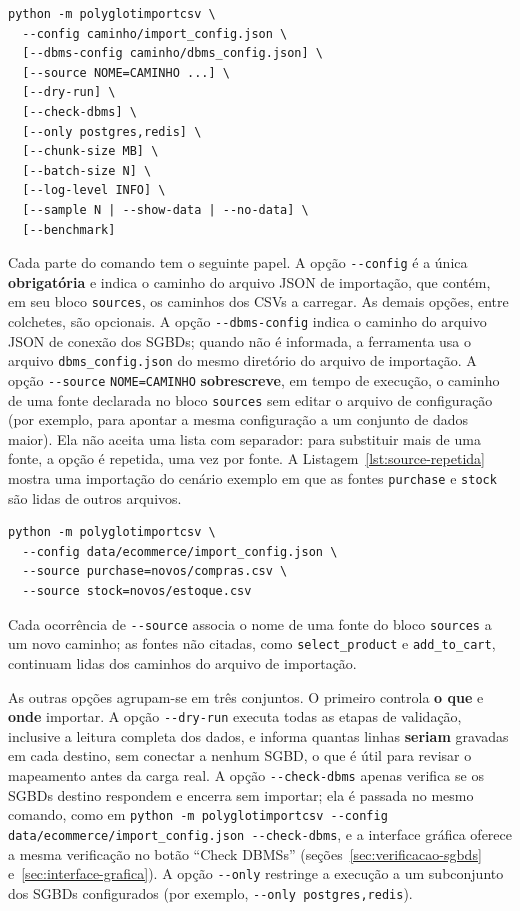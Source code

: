 \begin{lstlisting}[style=bashstyle]
python -m polyglotimportcsv \
  --config caminho/import_config.json \
  [--dbms-config caminho/dbms_config.json] \
  [--source NOME=CAMINHO ...] \
  [--dry-run] \
  [--check-dbms] \
  [--only postgres,redis] \
  [--chunk-size MB] \
  [--batch-size N] \
  [--log-level INFO] \
  [--sample N | --show-data | --no-data] \
  [--benchmark]
\end{lstlisting}

Cada parte do comando tem o seguinte papel. A opção \texttt{-{}-config} é a única
\textbf{obrigatória} e indica o caminho do arquivo JSON de importação, que contém, em seu
bloco \texttt{sources}, os caminhos dos CSVs a carregar. As demais opções, entre
colchetes, são opcionais. A opção \texttt{-{}-dbms-config} indica o caminho do arquivo
JSON de conexão dos SGBDs; quando não é informada, a ferramenta usa o arquivo
\texttt{dbms\_config.json} do mesmo diretório do arquivo de importação. A opção
\texttt{-{}-source} \texttt{NOME=CAMINHO} \textbf{sobrescreve}, em tempo de execução, o
caminho de uma fonte declarada no bloco \texttt{sources} sem editar o arquivo de
configuração (por exemplo, para apontar a mesma configuração a um conjunto de dados
maior). Ela não aceita uma lista com separador: para substituir mais de uma fonte, a
opção é repetida, uma vez por fonte. A Listagem~\ref{lst:source-repetida} mostra uma
importação do cenário exemplo em que as fontes \texttt{purchase} e \texttt{stock} são
lidas de outros arquivos.

\begin{lstlisting}[style=bashstyle,caption={Duas fontes substituídas com a opção \texttt{-{}-source} repetida.},label={lst:source-repetida}]
python -m polyglotimportcsv \
  --config data/ecommerce/import_config.json \
  --source purchase=novos/compras.csv \
  --source stock=novos/estoque.csv
\end{lstlisting}

Cada ocorrência de \texttt{-{}-source} associa o nome de uma fonte do bloco
\texttt{sources} a um novo caminho; as fontes não citadas, como \texttt{select\_product} e
\texttt{add\_to\_cart}, continuam lidas dos caminhos do arquivo de importação.

As outras opções agrupam-se em três conjuntos. O primeiro controla \textbf{o que} e
\textbf{onde} importar. A opção \texttt{-{}-dry-run} executa todas as etapas de
validação, inclusive a leitura completa dos dados, e informa quantas linhas
\textbf{seriam} gravadas em cada destino, sem conectar a nenhum SGBD, o que é útil para
revisar o mapeamento antes da carga real. A opção \texttt{-{}-check-dbms} apenas verifica
se os SGBDs destino respondem e encerra sem importar; ela é passada no mesmo comando,
como em \texttt{python -m polyglotimportcsv -{}-config data/ecommerce/import\_config.json
-{}-check-dbms}, e a interface gráfica oferece a mesma verificação no botão ``Check
DBMSs'' (seções~\ref{sec:verificacao-sgbds} e~\ref{sec:interface-grafica}). A opção
\texttt{-{}-only} restringe a execução a um subconjunto dos SGBDs configurados (por
exemplo, \texttt{-{}-only postgres,redis}).

